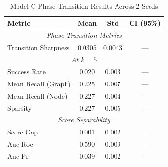 \begin{table}[htbp]
\centering
\caption{Model C Phase Transition Results Across 2 Seeds}
\label{tab:model_c_results}
\begin{tabular}{lccc}
\hline
\textbf{Metric} & \textbf{Mean} & \textbf{Std} & \textbf{CI (95\%)} \\
\hline
\multicolumn{4}{c}{\textit{Phase Transition Metrics}} \\
Transition Sharpness & 0.0305 & 0.0043 & --- \\
\hline
\multicolumn{4}{c}{\textit{At $k=5$}} \\
Success Rate & 0.020 & 0.003 & --- \\
Mean Recall (Graph) & 0.225 & 0.007 & --- \\
Mean Recall (Node) & 0.227 & 0.004 & --- \\
Sparsity & 0.227 & 0.005 & --- \\
\hline
\multicolumn{4}{c}{\textit{Score Separability}} \\
Score Gap & 0.001 & 0.002 & --- \\
Auc Roc & 0.590 & 0.009 & --- \\
Auc Pr & 0.039 & 0.002 & --- \\
\hline
\end{tabular}
\end{table}
